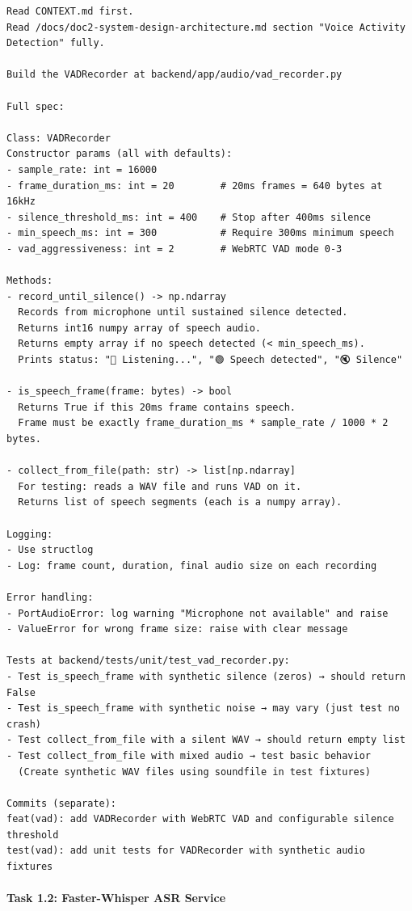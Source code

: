 \documentclass[
  11pt,
]{article}
\begin{document}
\begin{lstlisting}
Read CONTEXT.md first.
Read /docs/doc2-system-design-architecture.md section "Voice Activity Detection" fully.

Build the VADRecorder at backend/app/audio/vad_recorder.py

Full spec:

Class: VADRecorder
Constructor params (all with defaults):
- sample_rate: int = 16000
- frame_duration_ms: int = 20        # 20ms frames = 640 bytes at 16kHz
- silence_threshold_ms: int = 400    # Stop after 400ms silence
- min_speech_ms: int = 300           # Require 300ms minimum speech
- vad_aggressiveness: int = 2        # WebRTC VAD mode 0-3

Methods:
- record_until_silence() -> np.ndarray
  Records from microphone until sustained silence detected.
  Returns int16 numpy array of speech audio.
  Returns empty array if no speech detected (< min_speech_ms).
  Prints status: "🎤 Listening...", "🟢 Speech detected", "🔇 Silence"

- is_speech_frame(frame: bytes) -> bool
  Returns True if this 20ms frame contains speech.
  Frame must be exactly frame_duration_ms * sample_rate / 1000 * 2 bytes.

- collect_from_file(path: str) -> list[np.ndarray]
  For testing: reads a WAV file and runs VAD on it.
  Returns list of speech segments (each is a numpy array).

Logging:
- Use structlog
- Log: frame count, duration, final audio size on each recording

Error handling:
- PortAudioError: log warning "Microphone not available" and raise
- ValueError for wrong frame size: raise with clear message

Tests at backend/tests/unit/test_vad_recorder.py:
- Test is_speech_frame with synthetic silence (zeros) → should return False
- Test is_speech_frame with synthetic noise → may vary (just test no crash)
- Test collect_from_file with a silent WAV → should return empty list
- Test collect_from_file with mixed audio → test basic behavior
  (Create synthetic WAV files using soundfile in test fixtures)

Commits (separate):
feat(vad): add VADRecorder with WebRTC VAD and configurable silence threshold
test(vad): add unit tests for VADRecorder with synthetic audio fixtures
\end{lstlisting}

\hypertarget{task-1.2-faster-whisper-asr-service}{%
\paragraph{Task 1.2: Faster-Whisper ASR
Service}\label{task-1.2-faster-whisper-asr-service}}
\end{document}

